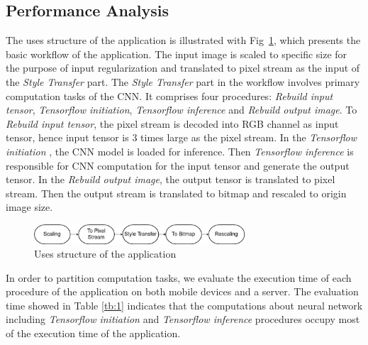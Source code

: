 \documentclass[a4paper,11pt,onecolumn,twoside]{article}
\begin{document}
\begin{CJK*}{GBK}{song}
\subsection{Performance Analysis}

The uses structure of the application is illustrated with Fig~\ref{uses},
which presents the basic workflow of the application. 
The input image is scaled to specific size for the purpose of 
input regularization and translated to pixel stream as 
the input of the \textit{Style Transfer} part. 
The \textit{Style Transfer} part in the workflow 
involves primary computation tasks of the CNN.  
It comprises four procedures: 
\textit{Rebuild input tensor}, \textit{Tensorflow initiation}, 
\textit{Tensorflow inference} and \textit{Rebuild output image}.
To \textit{Rebuild input tensor}, the pixel stream is decoded
into RGB channel as input tensor, hence input tensor is 3 times
large as the pixel stream. In the \textit{Tensorflow initiation}
, the CNN model is loaded for inference. 
Then \textit{Tensorflow inference} is responsible for CNN 
computation for the input tensor and generate the output tensor.
In the \textit{Rebuild output image}, 
the output tensor is translated to pixel stream.
Then the output stream is translated to bitmap and rescaled to origin
image size.


\begin{figure}[!htb] %
  \centering %
  \includegraphics[width=0.7\textwidth]{uses} %
  \caption{Uses structure of the application} %
  \label{uses} %
\end{figure}

In order to partition computation tasks,
we evaluate the execution time of each procedure of the application
on both mobile devices and a server. 
The evaluation time showed in Table \ref{tb:1} indicates that the 
computations about neural network including 
\textit{Tensorflow initiation}
and \textit{Tensorflow inference}\cite{tensorflow2015-whitepaper} 
procedures occupy most of the execution time of the application. 



\end{CJK*}
\end{document}
